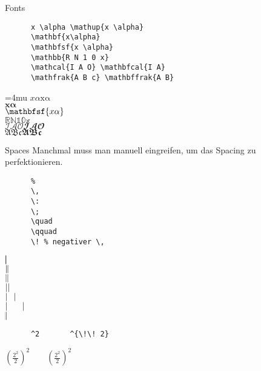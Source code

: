 \begin{frame}[fragile]{Fonts}
  \begin{CodeExample}{0.70}
    \begin{lstlisting}
      x \alpha \mathup{x \alpha}
      \mathbf{x\alpha}
      \mathbfsf{x \alpha}
      \mathbb{R N 1 0 x}
      \mathcal{I A O} \mathbfcal{I A}
      \mathfrak{A B c} \mathbffrak{A B}
    \end{lstlisting}
  \CodeResult
    \Umathordordspacing\textstyle=4mu
    $x \alpha \mathup{x \alpha}$ \\
    $\mathbf{x\alpha}$ \\
    $\mathbfsf{x \alpha}$ \\
    $\mathbb{R N 1 0 x}$ \\
    $\mathcal{I A O} \mathbfcal{I A O}$ \\
    $\mathfrak{A B c} \mathbffrak{A B c}$
  \end{CodeExample}
\end{frame}

\begin{frame}[fragile]{Spaces}
  Manchmal muss man manuell eingreifen, um das Spacing zu perfektionieren.
  \begin{CodeExample}{0.48}
    \begin{lstlisting}
      %
      \,
      \:
      \;
      \quad
      \qquad
      \! % negativer \,
    \end{lstlisting}
  \CodeResult
    $|\mspace{-5mu} |$ \\
    $|\mspace{-5mu} \,|$ \\
    $|\mspace{-5mu} \:|$ \\
    $|\mspace{-5mu} \;|$ \\
    $|\mspace{-5mu} \quad|$ \\
    $|\mspace{-5mu} \qquad|$ \\
    $|\mspace{-5mu} \!|$
  \end{CodeExample}
  \begin{CodeExample}{0.48}
    \begin{lstlisting}
      ^2       ^{\!\! 2}

    \end{lstlisting}
  \CodeResult
    $\displaystyle \left( \frac{2^2}{2} \right)^2
    \qquad \left( \frac{2^2}{2} \right)^{\!\! 2}$
  \end{CodeExample}
\end{frame}

